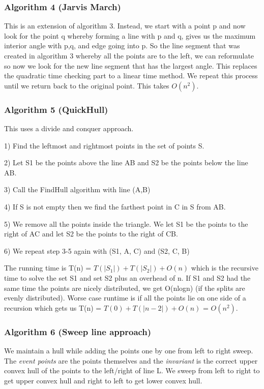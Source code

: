 \documentclass[11pt, oneside]{article}
\theoremstyle{definition}
\begin{document}
\subsubsection{Algorithm 4 (Jarvis March)}
This is an extension of algorithm 3. Instead, we start with a point p and now look for the point q whereby forming a line with p and q, gives us the maximum interior angle with p,q, and edge going into p. So the line segment that was created in algorithm 3 whereby all the points are to the left, we can reformulate so now we look for the new line segment that has the largest angle. This replaces the quadratic time checking part to a linear time method. We repeat this process until we return back to the original point. This takes $O(n^2)$.

\subsubsection{Algorithm 5 (QuickHull)}
This uses a divide and conquer approach.

1) Find the leftmost and rightmost points in the set of points S.

2) Let S1 be the points above the line AB and S2 be the points below the line AB.

3) Call the FindHull algorithm with line (A,B)

4) If S is not empty then we find the farthest point in C in S from AB.

5) We remove all the points inside the triangle. We let S1 be the points to the right of AC and let S2 be the points to the right of CB.

6) We repeat step 3-5 again with (S1, A, C) and (S2, C, B)

The running time is T(n) = $T(|S_1|) + T(|S_2|) + O(n)$ which is the recursive time to solve the set S1 and set S2 plus an overhead of n. If S1 and S2 had the same time the points are nicely distributed, we get O(nlogn) (if the splits are evenly distributed). Worse case runtime is if all the points lie on one side of a recursion which gets us T(n) = $T(0) + T(|n-2|) + O(n)$ = $O(n^2)$.

\subsubsection{Algorithm 6 (Sweep line approach)}
We maintain a hull while adding the points one by one from left to right sweep. The \textit{event points} are the points themselves and the \textit{invariant} is the correct upper convex hull of the points to the left/right of line L. We sweep from left to right to get upper convex hull and right to left to get lower convex hull.
\end{document}
